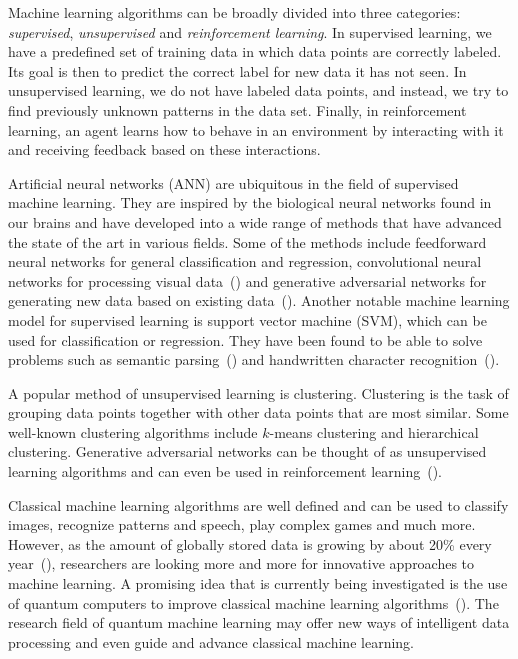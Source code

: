 \documentclass[a4paper,10pt]{article}
\begin{document}
Machine learning algorithms can be broadly divided into three categories: \emph{supervised}, \emph{unsupervised} and \emph{reinforcement learning}.
In supervised learning, we have a predefined set of training data in which data points are correctly labeled.
Its goal is then to predict the correct label for new data it has not seen.
In unsupervised learning, we do not have labeled data points, and instead, we try to find previously unknown patterns in the data set.
Finally, in reinforcement learning, an agent learns how to behave in an environment by interacting with it and receiving feedback based on these interactions.

Artificial neural networks (ANN) are ubiquitous in the field of supervised machine learning.
They are inspired by the biological neural networks found in our brains and have developed into a wide range of methods that have advanced the state of the art in various fields.
Some of the methods include feedforward neural networks for general classification and regression, convolutional neural networks for processing visual data~(\cite{cirecsan2012multi}) and generative adversarial networks for generating new data based on existing data~(\cite{goodfellow2014generative}).
Another notable machine learning model for supervised learning is support vector machine (SVM), which can be used for classification or regression.
They have been found to be able to solve problems such as semantic parsing~(\cite{pradhan2004shallow}) and handwritten character recognition~(\cite{decoste2002training}).

A popular method of unsupervised learning is clustering.
Clustering is the task of grouping data points together with other data points that are most similar.
Some well-known clustering algorithms include $k$-means clustering and hierarchical clustering.
Generative adversarial networks can be thought of as unsupervised learning algorithms and can even be used in reinforcement learning~(\cite{ho2016generative}).

Classical machine learning algorithms are well defined and can be used to classify images, recognize patterns and speech, play complex games and much more.
However, as the amount of globally stored data is growing by about 20\% every year~(\cite{hilbert2011world}), researchers are looking more and more for innovative approaches to machine learning.
A promising idea that is currently being investigated is the use of quantum computers to improve classical machine learning algorithms~(\cite{schuld2015introduction}).
The research field of quantum machine learning may offer new ways of intelligent data processing and even guide and advance classical machine learning.
\end{document}
